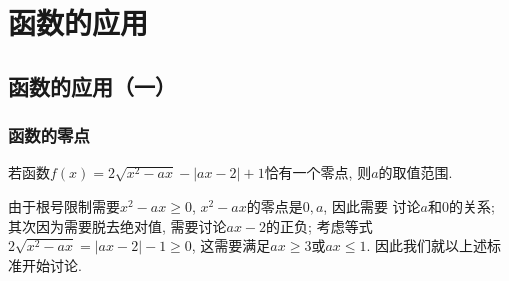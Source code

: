 \chapter{函数的应用}
\section{函数的应用（一）}
\subsection{函数的零点}

\begin{example}[2024年天津卷15]\label{高考:2024年天津卷15:1}
    若函数\(f(x)=2\sqrt{x^2-ax}-|ax-2|+1\)恰有一个零点, 则\(a\)的取值范围\uline{\makebox[1.5cm]{}}. 
\end{example}
\begin{jie}

    由于根号限制需要\(x^2-ax\geq 0\), \(x^2-ax\)的零点是\(0,a\), 因此需要 
    讨论\(a\)和\(0\)的关系; 其次因为需要脱去绝对值, 需要讨论\(ax-2\)的正负;
    考虑等式\(2\sqrt{x^2-ax}=|ax-2|-1\geq 0\), 这需要满足\(ax\geq 3\)或\(ax\leq 1\).
    因此我们就以上述标准开始讨论.


\end{jie}
